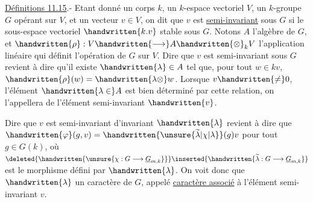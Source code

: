 \uline{Définitions 11.15}.- Etant donné un corps $k$, un $k$-espace vectoriel $V$, un $k$-groupe $G$ opérant sur $V$, et un vecteur $v\in V$, on dit que $v$ est \uline{semi-invariant} sous $G$ si le sous-espace vectoriel $\handwritten{k.v}$  stable sous $G$.
Notons $A$ l'algèbre de $G$, et $\handwritten{\rho}:V\handwritten{\longrightarrow}A\handwritten{\otimes}_k V$ l'application linéaire qui définit l'opération de $G$ sur $V$. Dire que $v$ est semi-invariant sous $G$ revient à dire  qu'il existe $\handwritten{\lambda}\in A$ tel que, pour tout $w\in kv$, $\handwritten{\rho}(w)=\handwritten{\lambda\otimes}w$. Lorsque $v\handwritten{\neq}0$, l'élément $\handwritten{\lambda\in}A$ est bien déterminé par cette relation, on l'appellera  de l'élément semi-invariant $\handwritten{v}$.

 Dire que $v$ est semi-invariant  d'invariant $\handwritten{\lambda}$ revient à dire que $\handwritten{\varphi}(g,v)=\handwritten{\unsure{\widetilde{\lambda}|\chi|\lambda}}(g)v$ pour tout $g\in G(k)$, où $\deleted{\handwritten{\unsure{\chi:G\longrightarrow\underline{G}_{m,k}}}}\inserted{\handwritten{\widetilde{\lambda}:G\longrightarrow\underline{G}_{m,k}}}$ est le morphisme défini par $\handwritten{\lambda}$. On voit donc que $\handwritten{\lambda}$  un caractère \deleted{\handwritten{\unsure{$\chi$}}} de $G$, appelé \uline{caractère associé} à l'élément semi-invariant $v$. 
\margin{\handwritten{!}}

